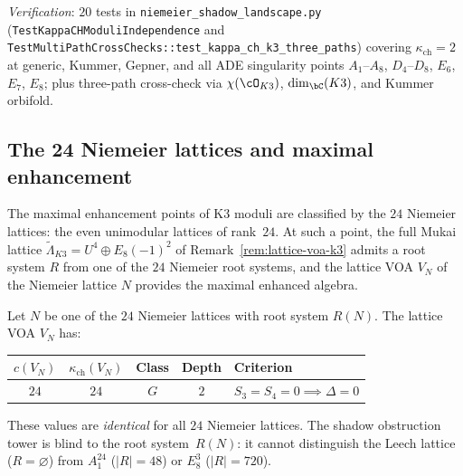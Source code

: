 \noindent\textit{Verification}: $20$ tests in
\texttt{niemeier\_shadow\_landscape.py} (\texttt{TestKappaCHModuliIndependence}
and \texttt{TestMultiPathCrossChecks::test\_kappa\_ch\_k3\_three\_paths}) covering
$\kappa_{\mathrm{ch}} = 2$ at generic, Kummer, Gepner, and all ADE singularity points
$A_1$--$A_8$, $D_4$--$D_8$, $E_6$, $E_7$, $E_8$; plus three-path cross-check
via $\chi(\cO_{K3})$, $\dim_{\bC}(K3)$, and Kummer orbifold.

\subsection{The 24 Niemeier lattices and maximal enhancement}
\label{subsec:k3-niemeier-landscape}

The maximal enhancement points of K3 moduli are classified by
the $24$ Niemeier lattices: the even unimodular lattices of rank~$24$.
At such a point, the full Mukai lattice
$\widetilde{\Lambda}_{K3} = U^4 \oplus E_8(-1)^2$ of
Remark~\ref{rem:lattice-voa-k3} admits a root system $R$ from one
of the $24$ Niemeier root systems, and the lattice VOA $V_N$
of the Niemeier lattice $N$ provides the maximal enhanced algebra.

\begin{proposition}
\label{prop:niemeier-shadow-landscape}
\ClaimStatusProvedHere
Let $N$ be one of the $24$ Niemeier lattices with root system $R(N)$.
The lattice VOA $V_N$ has:
\begin{center}
\renewcommand{\arraystretch}{1.3}
\begin{tabular}{ccccl}
\toprule
$c(V_N)$ & $\kappa_{\mathrm{ch}}(V_N)$ & \textbf{Class} & \textbf{Depth} & \textbf{Criterion} \\
\midrule
$24$ & $24$ & $G$ & $2$ & $S_3 = S_4 = 0 \implies \Delta = 0$ \\
\bottomrule
\end{tabular}
\end{center}
These values are \emph{identical} for all $24$ Niemeier lattices.
The shadow obstruction tower is blind to the root system~$R(N)$:
it cannot distinguish the Leech lattice \textup{(}$R = \varnothing$\textup{)}
from $A_1^{24}$ \textup{(}$|R| = 48$\textup{)} or $E_8^3$ \textup{(}$|R| = 720$\textup{)}.
\end{proposition}

